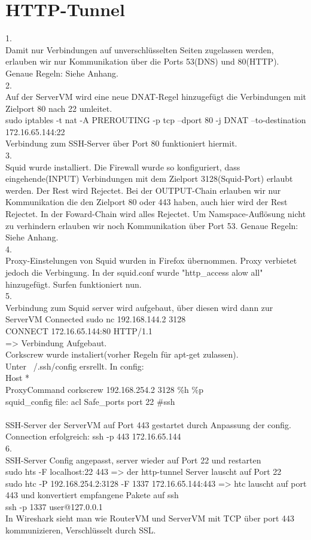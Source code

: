 \documentclass[12pt]{article}
\theoremstyle{plain}
\begin{document}
\section{HTTP-Tunnel}
1.\\
Damit nur Verbindungen auf unverschlüsselten Seiten zugelassen werden, erlauben wir nur Kommunikation über die Ports 53(DNS) und 80(HTTP). \\ Genaue Regeln: Siehe Anhang.\\
2.\\
Auf der ServerVM wird eine neue DNAT-Regel hinzugefügt die Verbindungen mit Zielport 80 nach 22 umleitet.\\
sudo iptables -t nat -A PREROUTING -p tcp --dport 80 -j DNAT --to-destination 172.16.65.144:22\\
Verbindung zum SSH-Server über Port 80 funktioniert hiermit.\\
3.\\
Squid wurde installiert.
Die Firewall wurde so konfiguriert, dass eingehende(INPUT) Verbindungen mit dem Zielport 3128(Squid-Port) erlaubt werden. Der Rest wird Rejectet. Bei der OUTPUT-Chain erlauben wir nur Kommunikation die den Zielport 80 oder 443 haben, auch hier wird der Rest Rejectet. In der Foward-Chain wird alles Rejectet. Um Namspace-Auflösung nicht zu verhindern erlauben wir noch Kommunikation über Port 53. Genaue Regeln: Siehe Anhang.\\
4.\\
Proxy-Einstelungen von Squid wurden in Firefox übernommen. Proxy verbietet jedoch die Verbingung. In der squid.conf wurde "http\_access alow all" hinzugefügt. Surfen funktioniert nun.\\
5.\\
Verbindung zum Squid server wird aufgebaut, über diesen wird dann zur ServerVM Connected
sudo nc 192.168.144.2 3128\\
CONNECT 172.16.65.144:80 HTTP/1.1\\
=> Verbindung Aufgebaut.\\
Corkscrew wurde instaliert(vorher Regeln für apt-get zulassen).\\
Unter ~/.ssh/config ersrellt. In config:\\
Host *\\
ProxyCommand corkscrew 192.168.254.2 3128 \%h \%p\\
squid\_config file: acl Safe\_ports port 22 \#ssh\\\\
SSH-Server der ServerVM auf Port 443 gestartet durch Anpassung der config.
Connection erfolgreich: ssh -p 443 172.16.65.144\\
6.\\
SSH-Server Config angepasst, server wieder auf Port 22 und restarten\\
sudo hts -F localhost:22 443 => der http-tunnel Server lauscht auf Port 22\\
sudo htc -P 192.168.254.2:3128 -F 1337 172.16.65.144:443 => htc lauscht auf port 443 und konvertiert empfangene Pakete auf ssh\\
ssh -p 1337 user@127.0.0.1\\
In Wireshark sieht man wie RouterVM und ServerVM mit TCP über port 443 kommunizieren, Verschlüsselt durch SSL.\\
\end{document}
